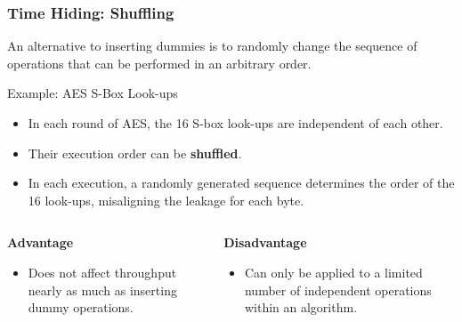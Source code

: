 \begin{frame}
    \frametitle{Time Hiding: Shuffling}

    An alternative to inserting dummies is to randomly change the sequence of operations that can be performed in an arbitrary order.

    \begin{block}{Example: AES S-Box Look-ups}
        \begin{itemize}
            \item In each round of AES, the 16 S-box look-ups are independent of each other.
            \item Their execution order can be \textbf{shuffled}.
            \item In each execution, a randomly generated sequence determines the order of the 16 look-ups, misaligning the leakage for each byte.
        \end{itemize}
    \end{block}

    \begin{columns}[T]
        \begin{column}{0.5\textwidth}
            \textbf{Advantage}
            \begin{itemize}
                \item Does not affect throughput nearly as much as inserting dummy operations.
            \end{itemize}
        \end{column}
        \begin{column}{0.5\textwidth}
            \textbf{Disadvantage}
            \begin{itemize}
                \item Can only be applied to a limited number of independent operations within an algorithm.
            \end{itemize}
        \end{column}
    \end{columns}
\end{frame}

